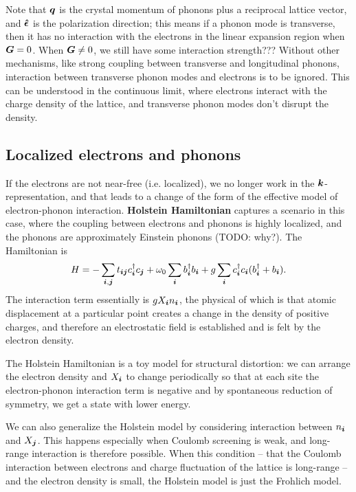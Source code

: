\documentclass[hyperref, a4paper]{article}
\newcommand*{\concept}[1]{{\textbf{#1}}}
\begin{document}
Note that $\vb*{q}$ is the crystal momentum of phonons
plus a reciprocal lattice vector, 
and $\vu*{\epsilon}$ is the polarization direction;
this means if a phonon mode is transverse, 
then it has no interaction with the electrons 
in the linear expansion region
when $\vb*{G} = 0$.
When $\vb*{G} \neq 0$, 
we still have some interaction strength???
Without other mechanisms, like strong coupling between transverse and longitudinal phonons, 
interaction between transverse phonon modes and electrons 
is to be ignored.
This can be understood in the continuous limit,
where electrons interact with the charge density of the lattice,
and transverse phonon modes don't 
disrupt the density.

\subsection{Localized electrons and phonons}

If the electrons are not near-free (i.e. localized), 
we no longer work in the $\vb*{k}$-representation, 
and that leads to a change of the form of the effective model 
of electron-phonon interaction. 
\concept{Holstein Hamiltonian} captures a scenario in this case,
where the coupling between electrons and phonons is highly localized, 
and the phonons are approximately Einstein phonons (TODO: why?).
The Hamiltonian is
\begin{equation}
    H = - \sum_{\vb*{i}, \vb*{j}} t_{\vb*{i} \vb*{j}} c^\dagger_{\vb*{i}} c_{\vb*{j}}
    + \omega_0 \sum_{\vb*{i}} b^\dagger_{\vb*{i}} b_{\vb*{i}}
    + g \sum_{\vb*{i}} c^\dagger_{\vb*{i}} c_{\vb*{i}} (b^\dagger_{\vb*{i}} + b_{\vb*{i}}).
\end{equation}
The interaction term essentially is $g X_{\vb*{i}} n_{\vb*{i}}$, 
the physical of which is that 
atomic displacement at a particular point creates
a change in the density of positive charges,
and therefore an electrostatic field is established 
and is felt by the electron density.

The Holstein Hamiltonian is a toy model for structural distortion:
we can arrange the electron density and $X_{\vb*{i}}$
to change periodically so that at each site 
the electron-phonon interaction term is negative 
and by spontaneous reduction of symmetry,
we get a state with lower energy.

We can also generalize the Holstein model 
by considering interaction between $n_{\vb*{i}}$ and $X_{\vb*{j}}$.
This happens especially when Coulomb screening is weak, 
and long-range interaction is therefore possible.
When this condition -- that the Coulomb interaction between electrons and charge fluctuation of the lattice is long-range --
and the electron density is small, 
the Holstein model is just the Frohlich model.
\end{document}
